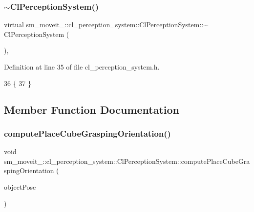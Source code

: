 \subsubsection{\texorpdfstring{$\sim$\+Cl\+Perception\+System()}{~ClPerceptionSystem()}}
{\footnotesize\ttfamily virtual sm\+\_\+moveit\+\_\+::cl\+\_\+perception\+\_\+system\+::\+Cl\+Perception\+System\+::$\sim$\+Cl\+Perception\+System (\begin{DoxyParamCaption}{ }\end{DoxyParamCaption})\hspace{0.3cm}{\ttfamily [inline]}, {\ttfamily [virtual]}}



Definition at line 35 of file cl\+\_\+perception\+\_\+system.\+h.


\begin{DoxyCode}
36             \{
37             \}
\end{DoxyCode}


\subsection{Member Function Documentation}
\mbox{\label{classsm__moveit__4_1_1cl__perception__system_1_1ClPerceptionSystem_afda35b6252c0a5c0692e3ff956609c23}} 
\subsubsection{\texorpdfstring{compute\+Place\+Cube\+Grasping\+Orientation()}{computePlaceCubeGraspingOrientation()}}
{\footnotesize\ttfamily void sm\+\_\+moveit\+\_\+::cl\+\_\+perception\+\_\+system\+::\+Cl\+Perception\+System\+::compute\+Place\+Cube\+Grasping\+Orientation (\begin{DoxyParamCaption}\item[{geometry\+\_\+msgs\+::\+Pose\+Stamped \&}]{object\+Pose }\end{DoxyParamCaption})\hspace{0.3cm}{\ttfamily [inline]}}



